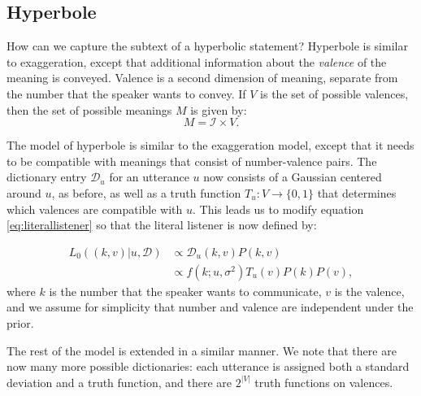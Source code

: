 \documentclass{article} %
\newcommand{\dictionary}{\ensuremath{\mathcal{D}}\xspace}
\begin{document}
\subsection{Hyperbole}

How can we capture the subtext of a hyperbolic statement? Hyperbole is similar to exaggeration, except that additional information about the \emph{valence} of the meaning is conveyed. Valence is a second dimension of meaning, separate from the number that the speaker wants to convey. If $V$ is the set of possible valences, then the set of possible meanings $M$ is given by:
\begin{equation}
M = {\mathcal I} \times V.
\end{equation}

The model of hyperbole is similar to the exaggeration model, except that it needs to be compatible with meanings that consist of number-valence pairs. The dictionary entry $\dictionary_u$ for an utterance $u$ now consists of a Gaussian centered around $u$, as before, as well as a truth function $T_u:V\rightarrow \{0,1\}$ that determines which valences are compatible with $u$. This leads us to modify equation \ref{eq:literallistener} so that the literal listener is now defined by:

\begin{align}\label{eq:valenceliteral}
L_0((k,v) | u, \dictionary) &\propto \dictionary_u(k,v)P(k,v) \\
&\propto f(k;u,\sigma^2)T_u(v)P(k)P(v),
\end{align}
where $k$ is the number that the speaker wants to communicate, $v$ is the valence, and we assume for simplicity that number and valence are independent under the prior. 

The rest of the model is extended in a similar manner. We note that there are now many more possible dictionaries: each utterance is assigned both a standard deviation and a truth function, and there are $2^{|V|}$ truth functions on valences. 
\end{document}
